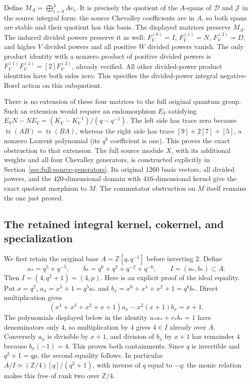 Define $M_A=\bigoplus_{i=0}^3Ae_i$. It is precisely the quotient of
the $A$-spans of $\mathcal D$ and $\mathcal J$ in the source integral
form: the source Chevalley coefficients are in $A$, so both spans
are stable and their quotient has this basis. The displayed matrices
preserve $M_A$. The induced divided powers preserve it as well:
$F_V^{(0)}=I$, $F_V^{(1)}=N$, $F_V^{(2)}=D$, and higher $V$ divided
powers and all positive $W$ divided powers vanish. The only product
identity with a nonzero product of positive divided powers is
$F_V^{(1)}F_V^{(1)}=[2]F_V^{(2)}$, already verified. All other
divided-power product identities have both sides zero. This specifies
the divided-power integral negative-Borel action on this subquotient.

There is no extension of these four matrices to the full original
quantum group. Such an extension would require an endomorphism $E_V$
satisfying $E_VN-NE_V=(K_V-K_V^{-1})/(q-q^{-1})$. The left side has
trace zero because $\operatorname{tr}(AB)=\operatorname{tr}(BA)$,
whereas the right side has trace $[9]+2[7]+[5]$, a nonzero Laurent
polynomial (its $q^8$ coefficient is one). This proves the exact
obstruction to that extension. The full source module $X$, with
its additional weights and all four Chevalley generators, is constructed
explicitly in Section~\ref{sec:full-source-generators}. Its original
$1260$ basis vectors, all divided powers, and the $420$-dimensional
domain with $416$-dimensional kernel give the exact quotient
morphism to $M$. The commutator obstruction on $M$ itself remains
the one just proved.

\subsection{The retained integral kernel, cokernel, and specialization}

We first retain the original base $A=\mathbb Z[q,q^{-1}]$ before
inverting $2$. Define
\[
 a_*=q^5+q^{-5},\qquad b_*=q^6+q^2+q^{-2}+q^{-6},\qquad
 I=(a_*,b_*)\subset A.
\]
Then $I=(4,q^2+1)=(4,p)$. Here is an explicit proof of the ideal
equality. Put $x=q^2$, $a_x=x^5+1=q^5a_*$ and
$b_x=x^6+x^4+x^2+1=q^6b_*$. Direct multiplication gives
\[
 (x^4+x^3+x^2+x+1)a_x-x^2(x+1)b_x=x+1.
\]
The polynomials displayed below in the identity
$u_*a_*+v_*b_*=1$ have denominators only $4$, so multiplication by
$4$ gives $4\in I$ already over $A$. Conversely $a_x$ is divisible
by $x+1$, and division of $b_x$ by $x+1$ has remainder $4$ because
$b_x(-1)=4$. This proves both containments. Since $q$ is invertible
and $q^2+1=qp$, the second equality follows. In particular
$A/I\simeq(\mathbb Z/4)[q]/(q^2+1)$, with inverse of $q$ equal to
$-q$; the monic relation makes this free of rank two over $\mathbb Z/4$.

